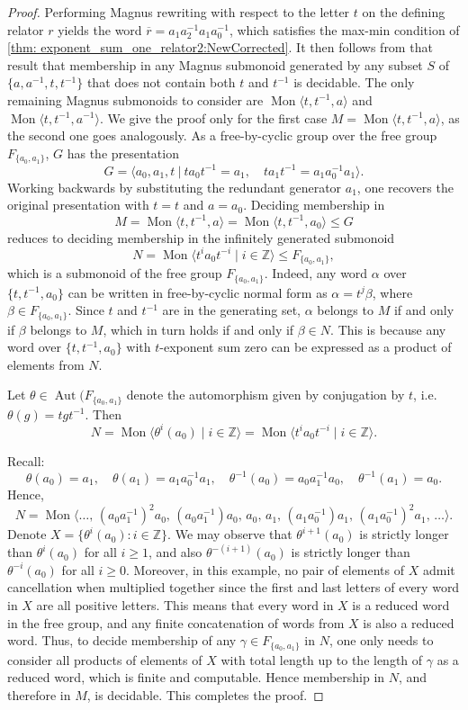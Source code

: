 \documentclass[11pt]{amsart}
\newcommand{\Mgen}[1]{\operatorname{Mon}\bigl\langle #1 \bigr\rangle}
\newcommand{\Gpres}[2]{\bigl\langle #1\:|\:#2 \bigr\rangle}
\DeclareMathOperator{\Aut}{Aut}
\newcommand{\Z}{\mathbb{Z}}
\theoremstyle{plain}
\theoremstyle{definition}
\begin{document}
\begin{proof} 
Performing Magnus rewriting with respect to the letter $t$ on the defining relator $r$ yields the word  
$\overline{r} = a_1 a_2^{-1} a_1 a_0^{-1}$,
which satisfies the max-min condition of \cref{thm: exponent_sum_one_relator2:NewCorrected}.
It then follows from that result that membership in any Magnus submonoid generated by any subset $S$ of $\{a,a^{-1},t,t^{-1}\}$ that does not contain both $t$ and $t^{-1}$ is decidable. The only remaining Magnus submonoids to consider are
$\Mgen{t, t^{-1}, a}$ and $\Mgen{t, t^{-1}, a^{-1}}$.  
We give the proof only for the first case $M = \Mgen{t, t^{-1}, a}$, as the second one goes analogously. 
As a free-by-cyclic group over the free group $F_{ \{ a_0,a_1 \}}$, $G$ has the presentation
\[
G = \Gpres{a_0, a_1, t}{t a_0 t^{-1} = a_1, \quad t a_1 t^{-1} = a_1 a_0^{-1} a_1}.
\]
Working backwards by substituting the redundant generator $a_1$, one recovers the original presentation with $t = t$ and $a = a_0$. Deciding membership in 
\[
M = \Mgen{t, t^{-1}, a} = \Mgen{t, t^{-1}, a_0} \leq G
\]
reduces to deciding membership in the infinitely generated submonoid 
\[
N = \Mgen{t^i a_0 t^{-i} \mid i \in \Z} \leq F_{ \{ a_0, a_1 \}},
\]
which is a submonoid of the free group $F_{ \{ a_0,a_1 \}}$. 
Indeed, any word $\alpha$ over $\{t, t^{-1}, a_0\}$ can be written in free-by-cyclic normal form as $\alpha = t^j \beta$,  
where $\beta \in F_{ \{ a_0, a_1 \}}$. Since $t$ and $t^{-1}$ are in the generating set, $\alpha$ belongs to $M$ if and only if $\beta$ belongs to $M$, which in turn holds if and only if $\beta \in N$. This is because any word over $\{t, t^{-1}, a_0\}$ with $t$-exponent sum zero can be expressed as a product of elements from $N$.

Let $\theta \in \Aut(F_{ \{ a_0,a_1 \} }$ denote the automorphism given by conjugation by $t$, i.e. $\theta(g) = t g t^{-1}$. Then
\[
N = \Mgen{\theta^i(a_0) \mid i \in \Z} = \Mgen{t^i a_0 t^{-i} \mid i \in \Z}.
\]

Recall:
\[
\theta(a_0) = a_1, \quad \theta(a_1) = a_1 a_0^{-1} a_1, \quad
\theta^{-1}(a_0) = a_0 a_1^{-1} a_0, \quad \theta^{-1}(a_1) = a_0.
\]
Hence,
\[
N = \Mgen{\ldots, \,
(a_0 a_1^{-1})^2 a_0, \,
(a_0 a_1^{-1}) a_0, \,
a_0, \,
a_1, \,
(a_1 a_0^{-1}) a_1, \,
(a_1 a_0^{-1})^2 a_1, \,
\ldots}.
\]
Denote $X = \{ \theta^i(a_0) : i \in \Z \}$. 
We may observe that $\theta^{i+1}(a_{0})$ is strictly longer than $\theta^i(a_0)$ for all $i \geq 1$, and also 
$\theta^{-(i+1)}(a_{0})$ is strictly longer than $\theta^{-i}(a_0)$ for all $i \geq 0$.
Moreover, in this example, no pair of elements of $X$ admit cancellation when multiplied together since the first and last letters of every word in $X$ are all positive letters. 
This means that every word in $X$ is a reduced word in the free group, and any finite concatenation of words from $X$ is also a reduced word. 
Thus, to decide membership of any $\gamma \in F_{ \{ a_0,a_1 \}}$ in $N$, one only needs to consider all products of elements of $X$ with total length up to the length of $\gamma$ as a reduced word, which is finite and computable. Hence membership in $N$, and therefore in $M$, is decidable.
This completes the proof.
\end{proof}
\end{document}

